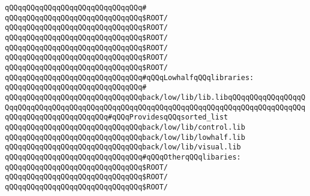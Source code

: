 \verb|qQQqqQQqqQQqqQQqqQQqqQQqqQQqqQQq#|\newline
\verb|qQQqqQQqqQQqqQQqqQQqqQQqqQQqqQQq$ROOT/|\newline
\verb|qQQqqQQqqQQqqQQqqQQqqQQqqQQqqQQq$ROOT/|\newline
\verb|qQQqqQQqqQQqqQQqqQQqqQQqqQQqqQQq$ROOT/|\newline
\verb|qQQqqQQqqQQqqQQqqQQqqQQqqQQqqQQq$ROOT/|\newline
\verb|qQQqqQQqqQQqqQQqqQQqqQQqqQQqqQQq$ROOT/|\newline
\verb|qQQqqQQqqQQqqQQqqQQqqQQqqQQqqQQq$ROOT/|\newline
\newline
\verb|qQQqqQQqqQQqqQQqqQQqqQQqqQQqqQQq#qQQqLowhalfqQQqlibraries:|\newline
\verb|qQQqqQQqqQQqqQQqqQQqqQQqqQQqqQQq#|\newline
\verb|qQQqqQQqqQQqqQQqqQQqqQQqqQQqqQQqback/low/lib/lib.libqQQqqQQqqQQqqQQqqQQqqQQqqQQqqQQqqQQqqQQqqQQqqQQqqQQqqQQqqQQqqQQqqQQqqQQqqQQqqQQqqQQqqQQqqQQqqQQqqQQqqQQqqQQqqQQq#qQQqProvidesqQQqsorted_list|\newline
\verb|qQQqqQQqqQQqqQQqqQQqqQQqqQQqqQQqback/low/lib/control.lib|\newline
\verb|qQQqqQQqqQQqqQQqqQQqqQQqqQQqqQQqback/low/lib/lowhalf.lib|\newline
\verb|qQQqqQQqqQQqqQQqqQQqqQQqqQQqqQQqback/low/lib/visual.lib|\newline
\newline
\verb|qQQqqQQqqQQqqQQqqQQqqQQqqQQqqQQq#qQQqOtherqQQqlibaries:|\newline
\verb|qQQqqQQqqQQqqQQqqQQqqQQqqQQqqQQq$ROOT/|\newline
\verb|qQQqqQQqqQQqqQQqqQQqqQQqqQQqqQQq$ROOT/|\newline
\verb|qQQqqQQqqQQqqQQqqQQqqQQqqQQqqQQq$ROOT/|\newline
